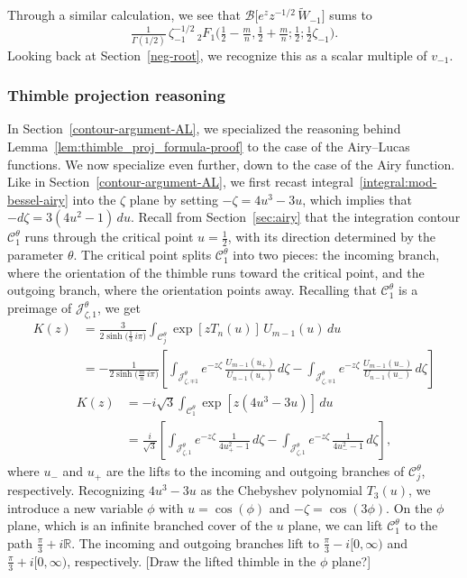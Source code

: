\documentclass{article}
\newcommand{\R}{\mathbb{R}}
\newcommand{\borel}{\mathcal{B}}
\theoremstyle{definition}
\theoremstyle{plain}
\newenvironment{verify}{\color{ForestGreen}}{\color{black}}
\newenvironment{todo}{\color{Coral}}{\color{black}}
\begin{document}
Through a similar calculation, we see that $\borel\big[ e^z z^{-1/2}\,\tilde{W}_{-1} \big]$ sums to
\[ \tfrac{1}{\Gamma(1/2)}\,\zeta_{-1}^{-1/2}\,{}_2F_1\big(\tfrac{1}{2}-\tfrac{m}{n}, \tfrac{1}{2}+\tfrac{m}{n}; \tfrac{1}{2}; \tfrac{1}{2}\zeta_{-1}\big). \]
Looking back at Section~\ref{neg-root}, we recognize this as a scalar multiple of $v_{-1}$.
%
\subsubsection{Thimble projection reasoning}\label{contour-argument-airy}
%
In Section~\ref{contour-argument-AL}, we specialized the reasoning behind Lemma~\ref{lem:thimble_proj_formula-proof} to the case of the Airy--Lucas functions. We now specialize even further, down to the case of the Airy function. Like in Section~\ref{contour-argument-AL}, we first recast integral~\eqref{integral:mod-bessel-airy} into the $\zeta$ plane by setting $-\zeta = 4u^3 - 3u$, which implies that $-d\zeta = 3(4u^2 - 1)\,du$. Recall from Section~\ref{sec:airy} that the integration contour $\mathcal{C}^\theta_1$ runs through the critical point $u = \tfrac{1}{2}$, with its direction determined by the parameter $\theta$. The critical point splits $\mathcal{C}^\theta_1$ into two pieces: the incoming branch, where the orientation of the thimble runs toward the critical point, and the outgoing branch, where the orientation points away. Recalling that $\mathcal{C}^\theta_1$ is a preimage of $\mathcal{J}^\theta_{\zeta,1}$, we get 
\begin{verify}
\begin{align*}
K(z) & = \frac{3}{2 \sinh\big(\tfrac{1}{3}\,i\pi\big)} \int_{\mathcal{C}^\theta_j} \exp\left[z T_n(u)\right]\,U_{m-1}(u)\,du \\
& = -\frac{1}{2\sinh\big(\tfrac{m}{n}\,i\pi\big)} \left[ \int_{\mathcal{J}^\theta_{\zeta, \mp 1}} e^{-z\zeta}\,\frac{U_{m-1}(u_+)}{U_{n-1}(u_+)}\,d\zeta - \int_{\mathcal{J}^\theta_{\zeta, \mp 1}} e^{-z\zeta}\,\frac{U_{m-1}(u_-)}{U_{n-1}(u_-)}\,d\zeta \right]
\end{align*}
\end{verify}
\begin{align*}
K(z) & = -i\sqrt{3} \int_{\mathcal{C}^\theta_1} \exp\left[z \left(4u^3 - 3u\right)\right]\,du \\
& = \frac{i}{\sqrt{3}} \left[ \int_{\mathcal{J}^\theta_{\zeta, 1}} e^{-z\zeta}\,\frac{1}{4u_+^2 - 1}\,d\zeta - \int_{\mathcal{J}^\theta_{\zeta, 1}} e^{-z\zeta}\,\frac{1}{4u_-^2 - 1}\,d\zeta \right],
\end{align*}
where $u_-$ and $u_+$ are the lifts to the incoming and outgoing branches of $\mathcal{C}^\theta_j$, respectively. Recognizing $4u^3 - 3u$ as the Chebyshev polynomial $T_3(u)$, we introduce a new variable $\phi$ with $u = \cos(\phi)$ and $-\zeta = \cos(3\phi)$. On the $\phi$ plane, which is an infinite branched cover of the $u$ plane, we can lift $\mathcal{C}^\theta_1$ to the path $\tfrac{\pi}{3} + i\R$. The incoming and outgoing branches lift to $\tfrac{\pi}{3} - i[0, \infty)$ and $\tfrac{\pi}{3} + i[0, \infty)$, respectively. \begin{todo}[Draw the lifted thimble in the $\phi$ plane?]\end{todo}
\end{document}
